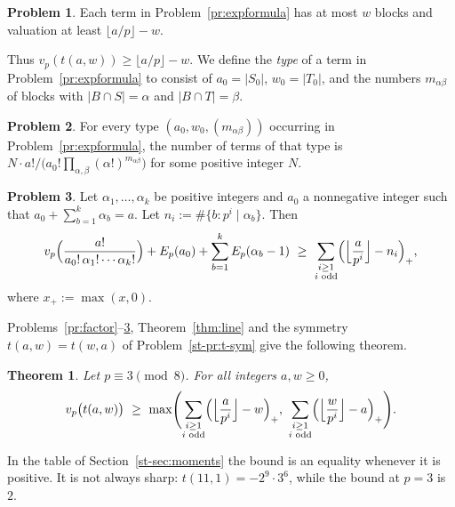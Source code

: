 \documentclass[reqno]{amsart}
\theoremstyle{definition}
\newtheorem{problem}{Problem}[section]
\theoremstyle{plain}
\newtheorem{theorem}{Theorem}[section]
\begin{document}
\begin{problem}\label{pr:first-level}
Each term in Problem~\ref{pr:expformula} has at most \(w\) blocks and valuation at least \(\lfloor a/p \rfloor - w\).
\end{problem}

Thus \(v_p(t(a,w)) \ge \lfloor a/p \rfloor - w\).  We define the \emph{type} of a term in Problem~\ref{pr:expformula} to consist of \(a_0 = \lvert S_0 \rvert\), \(w_0 = \lvert T_0 \rvert\), and the numbers \(m_{\alpha\beta}\) of blocks with \(\lvert B \cap S \rvert = \alpha\) and \(\lvert B \cap T \rvert = \beta\).

\begin{problem}\label{pr:multiplicity}
For every type \((a_0, w_0, (m_{\alpha\beta}))\) occurring in Problem~\ref{pr:expformula}, the number of terms of that type is \(N \cdot a!/\bigl(a_0! \prod_{\alpha,\beta} (\alpha!)^{m_{\alpha\beta}}\bigr)\) for some positive integer \(N\).
\end{problem}

\begin{problem}\label{pr:levels}
Let \(\alpha_1, \dotsc, \alpha_k\) be positive integers and \(a_0\) a nonnegative integer such that \(a_0 + \sum_{b=1}^k \alpha_b = a\).  Let \(n_i := \#\{b : p^i \mid \alpha_b\}\).  Then
\[
  v_p\Bigl(\frac{a!}{a_0!\, \alpha_1! \dotsm \alpha_k!}\Bigr) + E_p(a_0) + \sum_{b=1}^k E_p(\alpha_b - 1)
  \ \ge\ \sum_{\substack{i \ge 1 \\ i \text{ odd}}} \Bigl(\Bigl\lfloor \frac{a}{p^i} \Bigr\rfloor - n_i\Bigr)_+ ,
\]
where \(x_+ := \max(x, 0)\).
\end{problem}

Problems~\ref{pr:factor}--\ref{pr:levels}, Theorem~\ref{thm:line} and the symmetry \(t(a,w) = t(w,a)\) of Problem~\ref{st-pr:t-sym} give the following theorem.

\begin{theorem}\label{thm:main}
Let \(p \equiv 3 \pmod 8\).  For all integers \(a, w \ge 0\),
\[
  v_p\bigl(t(a,w)\bigr) \ \ge\ \max\Biggl( \sum_{\substack{i \ge 1 \\ i \text{ odd}}} \Bigl(\Bigl\lfloor \frac{a}{p^i} \Bigr\rfloor - w\Bigr)_+ ,\ \sum_{\substack{i \ge 1 \\ i \text{ odd}}} \Bigl(\Bigl\lfloor \frac{w}{p^i} \Bigr\rfloor - a\Bigr)_+ \Biggr) .
\]
\end{theorem}

In the table of Section~\ref{st-sec:moments} the bound is an equality whenever it is positive.  It is not always sharp: \(t(11,1) = -2^9 \cdot 3^6\), while the bound at \(p = 3\) is \(2\).
\end{document}
